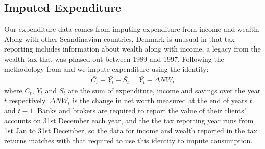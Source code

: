 \documentclass[titlepage]{\econtex}\newcommand{\texname}{IncomeUncertainty}
\begin{document}
\subsection{Imputed Expenditure} \label{cons_imputation}
Our expenditure data comes from imputing expenditure from income and wealth. Along with other Scandinavian countries, Denmark is unusual in that tax reporting includes information about wealth along with income, a legacy from the wealth tax that was phased out between 1989 and 1997. Following the methodology from \cite{browning_imputing_2003} and \cite{fagereng_imputing_2015} we impute expenditure using the identity:
		\begin{align*}
	\bar{C_t} \equiv \bar{Y_t} - \bar{S_t} = \bar{Y_t} - \Delta NW_t
	\end{align*}
where $\bar{C_t}$, $\bar{Y_t}$ and $\bar{S_t}$  are the sum of expenditure, income and savings over the year $t$ respectively. $\Delta NW_t$ is the change in net worth measured at the end of years $t$ and $t-1$. Banks and brokers are required to report the value of their clients' accounts on 31st December each year, and the the tax reporting year runs from 1st Jan to 31st December, so the data for income and wealth reported in the tax returns matches with that required to use this identity to impute consumption.
\end{document}
